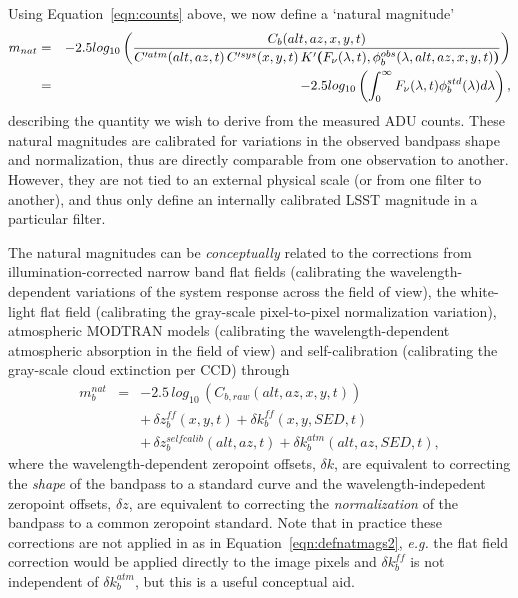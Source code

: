 \documentclass[12pt,preprint]{aastex}
\begin{document}
Using Equation~\ref{eqn:counts} above, we now define a `natural magnitude'
\begin{eqnarray}
\label{eqn:defnatmags}
m_{nat}  & = &-2.5 log_{10} \left( {C_b(alt,az,x,y,t) \over 
C'^{atm}(alt,az,t) \, C'^{sys}(x,y,t) \,
K'{\textbf(}F_\nu(\lambda,t),
\phi_b^{obs}(\lambda,alt,az,x,y,t){\textbf)} } \right) \nonumber \\
 & = & -2.5 log_{10} \left( \int_0^\infty
   {F_\nu(\lambda,t)\phi_b^{std}(\lambda)  d\lambda} \right),
\end{eqnarray}
describing the quantity we wish to derive from the measured ADU counts. 
These natural magnitudes are calibrated for variations in the observed
bandpass shape and normalization, thus are directly comparable from
one observation to another. However, they are not tied to an external
physical scale (or from one filter to another), and thus only define an internally calibrated LSST
magnitude in a particular filter.

The natural magnitudes can be {\it conceptually} related to the corrections
from illumination-corrected narrow band flat fields (calibrating the
wavelength-dependent variations of the system response across the
field of view), the white-light flat field (calibrating the gray-scale pixel-to-pixel
normalization variation), atmospheric MODTRAN models (calibrating the
wavelength-dependent atmospheric absorption in the field of view) and
self-calibration (calibrating the gray-scale cloud extinction per CCD)
through
\begin{eqnarray}
\label{eqn:defnatmags2}
m_b^{nat} & = &-2.5 \, log_{10} \, (C_{b, raw}(alt,az,x,y,t))
\nonumber \\ 
 & & +\, \delta z_b^{ff}(x,y,t) + \delta k_b^{ff}(x,y,SED,t)  \nonumber \\  
 & &+\, \delta z_b^{selfcalib}(alt,az,t)  + \delta k_b^{atm}(alt,az,SED,t), 
\end{eqnarray}
where the wavelength-dependent zeropoint offsets, $\delta k$, are
equivalent to correcting the {\it shape} of the bandpass to a standard
curve and the wavelength-indepedent
zeropoint offsets, $\delta z$, are equivalent to
correcting the {\it normalization} of the bandpass to a common zeropoint
standard. Note that in practice these corrections are not applied in
as in Equation~\ref{eqn:defnatmags2}, {\it e.g.} the flat field
correction would be applied directly to the image pixels and $\delta
k_b^{ff}$ is not independent of $\delta k_b^{atm}$, but this is a
useful conceptual aid.
\end{document}
